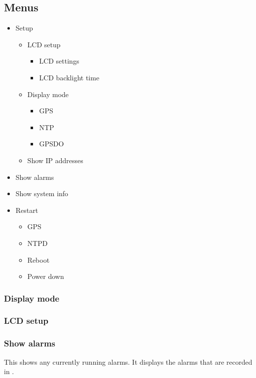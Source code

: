\subsection{Menus}

\begin{itemize}
	\item Setup
		\begin{itemize}
			\item LCD setup
				\begin{itemize}
					\item LCD settings
					\item LCD backlight time
				\end{itemize}
			\item Display mode
				\begin{itemize}
					\item GPS
					\item NTP
					\item GPSDO
				\end{itemize}
			\item Show IP addresses
		\end{itemize}
		
	\item Show alarms
	\item Show system info
	\item Restart
		\begin{itemize}
			\item GPS
			\item NTPD
			\item Reboot
			\item Power down
		\end{itemize}
\end{itemize}

\subsubsection{Display mode}

\subsubsection{LCD setup}


\subsubsection{Show alarms}

This shows any currently running alarms.
It displays the alarms that are recorded in .

